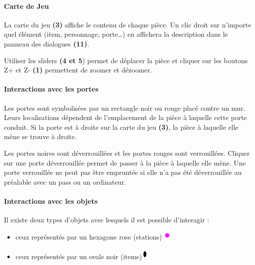 \documentclass[./standalone.tex]{subfiles}
\begin{document}
\newpage


\paragraph{Carte de Jeu\\}
    La carte du jeu \textbf{(3)} affiche le contenu de chaque pièce. Un clic droit sur n’importe quel élément (item, personnage, porte…) en affichera la description dans le panneau des dialogues \textbf{(11)}.
\par Utiliser les sliders \textbf{(4 et 5}) permet de déplacer la pièce et cliquer sur les boutons Z+ et Z- \textbf{(1)} permettent de zoomer et dézoomer.

\paragraph{Interactions avec les portes\\}
    Les portes sont symbolisées par un rectangle noir ou rouge placé contre un mur. Leurs localisations dépendent de l’emplacement de la pièce à laquelle cette porte conduit. Si la porte est à droite sur la carte du jeu \textbf{(3)}, la pièce à laquelle elle mène se trouve à droite. 
\par Les portes noires sont déverrouillées et les portes rouges sont verrouillées. Cliquer sur une porte déverrouillée permet de passer à la pièce à laquelle elle mène. Une porte verrouillée ne peut pas être empruntée si elle n’a pas été déverrouillée au préalable avec un pass ou un ordinateur.
        
\paragraph{Interactions avec les objets\\}
    Il existe deux types d’objets avec lesquels il est possible d’interagir :
    \begin{itemize}
    	\item ceux représentés par un hexagone rose (stations) \includegraphics[scale=1]{images/hexagone.png}
    	\item ceux représentés par un ovale noir (items)\includegraphics[scale=1]{images/ellipse.png}
    \end{itemize}
            
\end{document}
